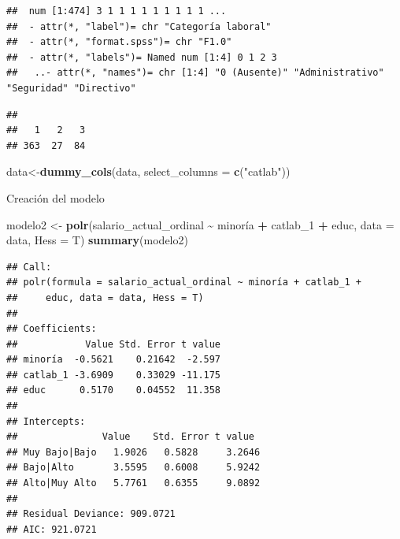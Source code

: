 \documentclass[
]{article}
\newenvironment{Shaded}{\begin{snugshade}}{\end{snugshade}}
\newcommand{\AttributeTok}[1]{\textcolor[rgb]{0.13,0.29,0.53}{#1}}
\newcommand{\FunctionTok}[1]{\textcolor[rgb]{0.13,0.29,0.53}{\textbf{#1}}}
\newcommand{\NormalTok}[1]{#1}
\newcommand{\OtherTok}[1]{\textcolor[rgb]{0.56,0.35,0.01}{#1}}
\newcommand{\SpecialCharTok}[1]{\textcolor[rgb]{0.81,0.36,0.00}{\textbf{#1}}}
\newcommand{\StringTok}[1]{\textcolor[rgb]{0.31,0.60,0.02}{#1}}
\begin{document}
\begin{verbatim}
##  num [1:474] 3 1 1 1 1 1 1 1 1 1 ...
##  - attr(*, "label")= chr "Categoría laboral"
##  - attr(*, "format.spss")= chr "F1.0"
##  - attr(*, "labels")= Named num [1:4] 0 1 2 3
##   ..- attr(*, "names")= chr [1:4] "0 (Ausente)" "Administrativo" "Seguridad" "Directivo"
\end{verbatim}

\begin{Shaded}
\end{Shaded}

\begin{verbatim}
## 
##   1   2   3 
## 363  27  84
\end{verbatim}

\begin{Shaded}
\begin{Highlighting}[]
\NormalTok{data}\OtherTok{\textless{}{-}}\FunctionTok{dummy\_cols}\NormalTok{(data, }\AttributeTok{select\_columns =} \FunctionTok{c}\NormalTok{(}\StringTok{"catlab"}\NormalTok{))}
\end{Highlighting}
\end{Shaded}

Creación del modelo

\begin{Shaded}
\begin{Highlighting}[]
\NormalTok{modelo2 }\OtherTok{\textless{}{-}} \FunctionTok{polr}\NormalTok{(salario\_actual\_ordinal }\SpecialCharTok{\textasciitilde{}}\NormalTok{ minoría }\SpecialCharTok{+}\NormalTok{ catlab\_1 }\SpecialCharTok{+}\NormalTok{ educ, }\AttributeTok{data =}\NormalTok{ data, }\AttributeTok{Hess =}\NormalTok{ T)}
\FunctionTok{summary}\NormalTok{(modelo2)}
\end{Highlighting}
\end{Shaded}

\begin{verbatim}
## Call:
## polr(formula = salario_actual_ordinal ~ minoría + catlab_1 + 
##     educ, data = data, Hess = T)
## 
## Coefficients:
##            Value Std. Error t value
## minoría  -0.5621    0.21642  -2.597
## catlab_1 -3.6909    0.33029 -11.175
## educ      0.5170    0.04552  11.358
## 
## Intercepts:
##               Value    Std. Error t value 
## Muy Bajo|Bajo   1.9026   0.5828     3.2646
## Bajo|Alto       3.5595   0.6008     5.9242
## Alto|Muy Alto   5.7761   0.6355     9.0892
## 
## Residual Deviance: 909.0721 
## AIC: 921.0721
\end{verbatim}
\end{document}
